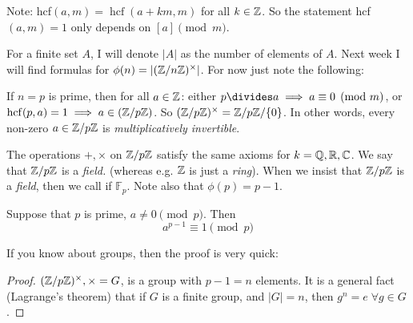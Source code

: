 \documentclass[twoside]{scrartcl}
\DeclareMathOperator{\hcf}{hcf}
\begin{document}
Note: hcf$(a,m) = \hcf(a + km, m)$ for all $k \in\mathbb{Z}$. So the statement hcf$(a,m) = 1$ only depends on $[a] \pmod{m}$. 

For a finite set $A$, I will denote $|A|$ as the number of elements of $A$. Next week I will find formulas for $\phi(n) = |(\mathbb{Z}/ n\mathbb{Z})^\times |$. For now just note the following:

 If $n = p$ is prime, then for all $a \in\mathbb{Z}$: either $p \divides a \implies a \equiv 0 \pmod{m}$, or $\hcf(p,a) = 1 \implies a \in (\Z / p\Z)$. So $(\mathbb{Z} / p\mathbb{Z})^\times = \mathbb{Z} / p\mathbb{Z} / \{0\}$. In other words, every non-zero $a \in \mathbb{Z} / p\mathbb{Z}$ is \emph{multiplicatively invertible}. 

The operations $+, \times$ on $\mathbb{Z} / p\mathbb{Z}$ satisfy the same axioms for $k = \mathbb{Q}, \mathbb{R}, \mathbb{C}$. We say that $\mathbb{Z} / p\mathbb{Z}$ is a \emph{field.} (whereas e.g. $\mathbb{Z}$ is just a \emph{ring}). When we insist that $\mathbb{Z} / p\mathbb{Z}$ is a \emph{field}, then we call if $\mathbb{F}_p$. Note also that $\phi(p) = p-1$. \\


\begin{theorem}
Suppose that $p$ is prime, $a \neq 0 \pmod{p}$. Then 
\[a^{p-1} \equiv 1 \pmod{p}\]
\end{theorem}

If you know about groups, then the proof is very quick: 
\begin{proof}
$(\mathbb{Z} / p\mathbb{Z})^\times, \times = G$, is a group with $p-1 = n$ elements. It is a general fact (Lagrange's theorem) that if $G$ is a finite group, and $|G| = n$, then $g^n = e\; \forall g \in G$. 
\end{proof}
\end{document}
